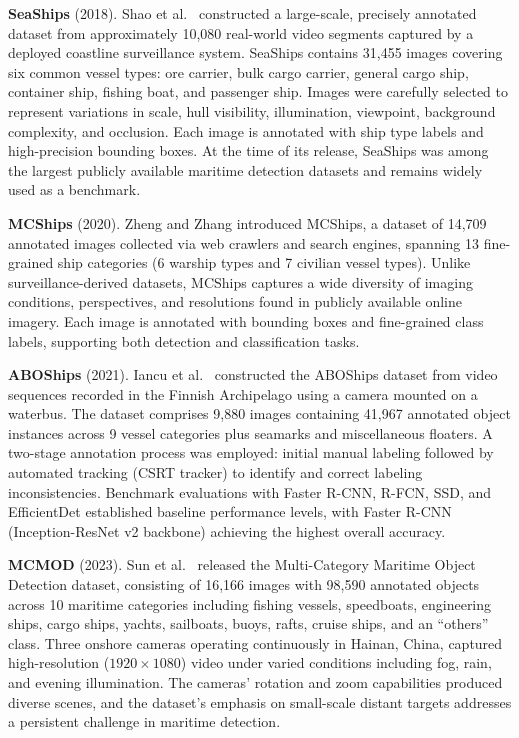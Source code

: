 \textbf{SeaShips} (2018). Shao et al.~\cite{Shao2018SeaShips} constructed a large-scale,
precisely annotated dataset from approximately 10,080 real-world video segments captured
by a deployed coastline surveillance system. SeaShips contains 31,455 images covering six
common vessel types: ore carrier, bulk cargo carrier, general cargo ship, container ship,
fishing boat, and passenger ship. Images were carefully selected to represent variations
in scale, hull visibility, illumination, viewpoint, background complexity, and occlusion.
Each image is annotated with ship type labels and high-precision bounding boxes. At the
time of its release, SeaShips was among the largest publicly available maritime detection
datasets and remains widely used as a benchmark.

\textbf{MCShips} (2020). Zheng and Zhang \cite{Zheng2020MCShips} introduced MCShips, a
dataset of 14,709 annotated images collected via web crawlers and search engines,
spanning 13 fine-grained ship categories (6 warship types and 7 civilian vessel types).
Unlike surveillance-derived datasets, MCShips captures a wide diversity of imaging
conditions, perspectives, and resolutions found in publicly available online imagery.
Each image is annotated with bounding boxes and fine-grained class labels, supporting
both detection and classification tasks.

\textbf{ABOShips} (2021). Iancu et al.~\cite{Iancu2021ABOShips} constructed the ABOShips
dataset from video sequences recorded in the Finnish Archipelago using a camera mounted
on a waterbus. The dataset comprises 9,880 images containing 41,967 annotated object
instances across 9 vessel categories plus seamarks and miscellaneous floaters. A two-stage
annotation process was employed: initial manual labeling followed by automated tracking
(CSRT tracker) to identify and correct labeling inconsistencies. Benchmark evaluations
with Faster R-CNN, R-FCN, SSD, and EfficientDet established baseline performance levels,
with Faster R-CNN (Inception-ResNet v2 backbone) achieving the highest overall accuracy.

\textbf{MCMOD} (2023). Sun et al.~\cite{Sun2023MCMOD} released the Multi-Category
Maritime Object Detection dataset, consisting of 16,166 images with 98,590 annotated
objects across 10 maritime categories including fishing vessels, speedboats, engineering
ships, cargo ships, yachts, sailboats, buoys, rafts, cruise ships, and an ``others''
class. Three onshore cameras operating continuously in Hainan, China, captured
high-resolution ($1920 \times 1080$) video under varied conditions including fog, rain,
and evening illumination. The cameras' rotation and zoom capabilities produced diverse
scenes, and the dataset's emphasis on small-scale distant targets addresses a persistent
challenge in maritime detection.

